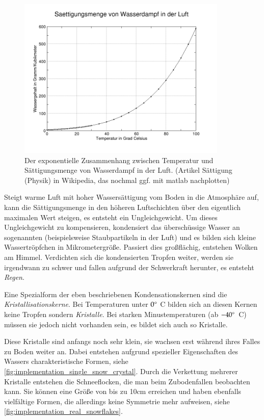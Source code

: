 \begin{figure}[ht]
\centering
\includegraphics[width=10cm]{images/moist_air}
\caption{Der exponentielle Zusammenhang zwischen Temperatur und Sättigungsmenge von Wasserdampf in der Luft. (Artikel Sättigung (Physik) in Wikipedia, das nochmal ggf. mit matlab nachplotten)}
\label{fig:implementation_moist_air}
\end{figure}

Steigt warme Luft mit hoher Wassersättigung vom Boden in die
Atmosphäre auf, kann die Sättigungsmenge in den höheren Luftschichten
über den eigentlich maximalen Wert steigen, es entsteht ein
Ungleichgewicht. Um dieses Ungleichgewicht zu kompensieren, kondensiert
das überschüssige Wasser an sogenannten
 (beispielsweise Staubpartikeln in
der Luft) und es bilden sich kleine Wassertröpfchen in
Mikrometergröße. Passiert dies großflächig, entstehen Wolken am
Himmel. Verdichten sich die kondensierten Tropfen weiter, werden sie
irgendwann zu schwer und fallen aufgrund der Schwerkraft herunter, es
entsteht \emph{Regen}.

Eine Spezialform der eben beschriebenen Kondensationskernen sind die
\emph{Kristallisationskerne}. Bei Temperaturen unter $0^{\circ}$
C bilden sich an diesen Kernen keine Tropfen sondern \emph{Kristalle}.
Bei starken Minustemperaturen (ab $-40^{\circ}$ C) müssen sie
jedoch nicht vorhanden sein, es bildet sich auch so Kristalle.

Diese Kristalle sind anfangs noch sehr klein, sie wachsen erst während ihres
Falles zu Boden weiter an. Dabei entstehen aufgrund spezieller
Eigenschaften des Wassers charakteristische Formen, siehe
\autoref{fig:implementation_single_snow_crystal}. Durch die Verkettung
mehrerer Kristalle entstehen die Schneeflocken, die man beim
Zubodenfallen beobachten kann. Sie können eine Größe von bis zu 10cm
erreichen\cite{Nau96} und haben ebenfalls vielfältige Formen, die
allerdings keine Symmetrie mehr aufweisen, siehe
\autoref{fig:implementation_real_snowflakes}.

